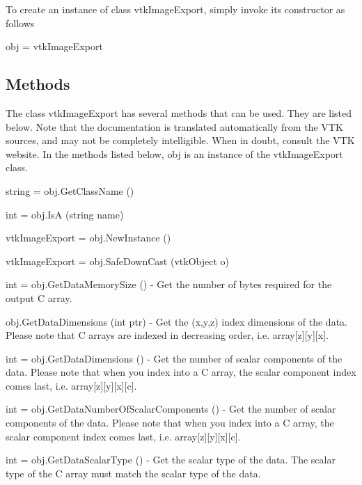 To create an instance of class vtk\-Image\-Export, simply invoke its constructor as follows \begin{DoxyVerb}  obj = vtkImageExport
\end{DoxyVerb}
 \hypertarget{vtkwidgets_vtkxyplotwidget_Methods}{}\subsection{Methods}\label{vtkwidgets_vtkxyplotwidget_Methods}
The class vtk\-Image\-Export has several methods that can be used. They are listed below. Note that the documentation is translated automatically from the V\-T\-K sources, and may not be completely intelligible. When in doubt, consult the V\-T\-K website. In the methods listed below, {\ttfamily obj} is an instance of the vtk\-Image\-Export class. 
\begin{DoxyItemize}
\item {\ttfamily string = obj.\-Get\-Class\-Name ()}  
\item {\ttfamily int = obj.\-Is\-A (string name)}  
\item {\ttfamily vtk\-Image\-Export = obj.\-New\-Instance ()}  
\item {\ttfamily vtk\-Image\-Export = obj.\-Safe\-Down\-Cast (vtk\-Object o)}  
\item {\ttfamily int = obj.\-Get\-Data\-Memory\-Size ()} -\/ Get the number of bytes required for the output C array.  
\item {\ttfamily obj.\-Get\-Data\-Dimensions (int ptr)} -\/ Get the (x,y,z) index dimensions of the data. Please note that C arrays are indexed in decreasing order, i.\-e. array\mbox{[}z\mbox{]}\mbox{[}y\mbox{]}\mbox{[}x\mbox{]}.  
\item {\ttfamily int = obj.\-Get\-Data\-Dimensions ()} -\/ Get the number of scalar components of the data. Please note that when you index into a C array, the scalar component index comes last, i.\-e. array\mbox{[}z\mbox{]}\mbox{[}y\mbox{]}\mbox{[}x\mbox{]}\mbox{[}c\mbox{]}.  
\item {\ttfamily int = obj.\-Get\-Data\-Number\-Of\-Scalar\-Components ()} -\/ Get the number of scalar components of the data. Please note that when you index into a C array, the scalar component index comes last, i.\-e. array\mbox{[}z\mbox{]}\mbox{[}y\mbox{]}\mbox{[}x\mbox{]}\mbox{[}c\mbox{]}.  
\item {\ttfamily int = obj.\-Get\-Data\-Scalar\-Type ()} -\/ Get the scalar type of the data. The scalar type of the C array must match the scalar type of the data.  

\end{DoxyItemize}
